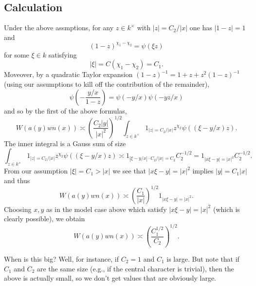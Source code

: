 \documentclass[reqno]{amsart} 
\begin{document}
\subsection{Calculation}
\label{sec:orgf3b1c43}
Under the above assmptions, for any $z \in k^\times$ with $|z| = C_2/|x|$ one has $|1 - z| = 1$ and
\begin{equation*}
  (1 - z)^{\chi_1 - \chi_2} = \psi(\xi z)
\end{equation*}
for some $\xi \in k$ satisfying
\begin{equation*}
  |\xi| = C(\chi_1 - \chi_2) = C_1.
\end{equation*}
Moveover, by a quadratic Taylor expansion $(1 - z)^{-1} = 1 + z + z^2 ( 1 - z)^{-1}$ (using our assumptions to kill off the contribution of the remainder),
\begin{equation*}
  \psi
  \left(
    - \frac{y/x}{1 - z}
  \right)
  =
  \psi
  (-y/x)
  \psi(- y z / x)
\end{equation*}
and so by the first of the above formulas,
\begin{equation*}
  W(a(y) w n(x))
  \asymp
  \left( \frac{C_2 |y|}{|x|^2} \right)^{1/2}
  \int_{z \in k^\times}
  1_{|z| = C_2/|x|}
  z^{\chi_2} \psi((\xi - y/x) z).
\end{equation*}
The inner integral is a Gauss sum of size
\begin{equation*}
  \int_{z \in k^\times}
  1_{|z| = C_2/|x|}
  z^{\chi_2} \psi((\xi - y/x) z)
  \asymp
  1_{|\xi - y/x| \cdot C_2/|x| = C_2}
  C_2^{-1/2}
  =
  1_{|x \xi - y| = |x|^2} C_2^{-1/2}.
\end{equation*}
From our assumption $|\xi| = C_1 > |x|$ we see that $|x \xi - y| = |x|^2$ implies $|y| = C_1 |x|$ and thus
\begin{equation*}
  W(a(y) w n(x))
  \asymp
  \left( \frac{C_1}{|x|} \right)^{1/2}
  1_{|x \xi - y| = |x|^2}.
\end{equation*}
Choosing $x,y$ as in the model case above which satisfy $|x \xi - y| = |x|^2$ (which is clearly possible), we obtain
\begin{equation*}
  W(a(y) w n(x))
  \asymp
  \left( \frac{C_1^{1/2}}{C_2} \right)^{1/2}.
\end{equation*}

When is this big?  Well, for instance, if $C_2 = 1$ and $C_1$ is large.  But note that if $C_1$ and $C_2$ are the same size (e.g., if the central character is trivial), then the above is actually small, so we don't get values that are obviously large.

{} 
\end{document}

